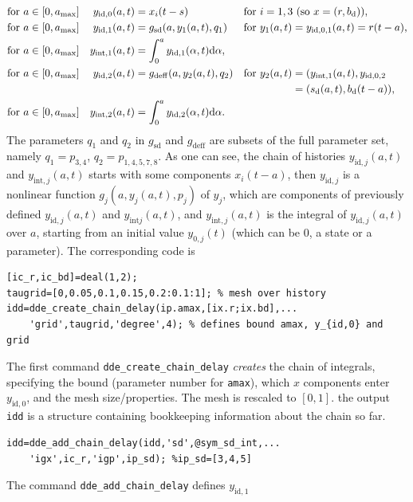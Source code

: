 \documentclass[10pt]{scrartcl}
\renewcommand{\d}{\mathrm{d}}
\newcommand{\blist}[1]{\mbox{\lstinline!#1!}}
\begin{document}
\begin{align*}
  \mbox{for\ }a\in[0,a_{\max}]&&y_{\mathrm{id},0}(a,t)&=x_i(t-s)&&\mbox{for $i=1,3$ (so $x=(r,b_\mathrm{d})$),}\\
  \mbox{for\ }a\in[0,a_{\max}]&&  y_{\mathrm{id},1}(a,t)&=g_\mathrm{sd}(a,y_1(a,t),q_1)&&\mbox{for $y_1(a,t)=y_{\mathrm{id},0,1}(a,t)=r(t-a)$,}\\
  \mbox{for\ }a\in[0,a_{\max}]&&  y_{\mathrm{int},1}(a,t)&=\int_0^a y_{\mathrm{id},1}(\alpha,t)\d \alpha,\\
  \mbox{for\ }a\in[0,a_{\max}]&&  y_{\mathrm{id},2}(a,t)&=g_\mathrm{deff}(a,y_2(a,t),q_2)&&\mbox{for $y_2(a,t)=(y_{\mathrm{int},1}(a,t),y_{\mathrm{id,0,2}}$}\\
  &&&&&\mbox{\phantom{for\ }$\phantom{y_2(t,a)}=(s_\mathrm{d}(a,t),b_\mathrm{d}(t-a))$,}\\
  \mbox{for\ }a\in[0,a_{\max}]&&  y_{\mathrm{int},2}(a,t)&=\int_0^a y_{\mathrm{id},2}(\alpha,t)\d \alpha.  
\end{align*}
The parameters $q_1$ and $q_2$ in $g_\mathrm{sd}$ and
$g_\mathrm{deff}$ are subsets of the full parameter set, namely
$q_1=p_{3,4}$, $q_2=p_{1,4,5,7,8}$.  As one can see, the chain of
histories $y_{\mathrm{id},j}(a,t)$ and $y_{\mathrm{int},j}(a,t)$
starts with some components $x_i(t-a)$, then $y_{\mathrm{id},j}$ is a
nonlinear function $g_j(a, y_j(a,t),p_j)$ of $y_j$, which are
components of previously defined $y_{\mathrm{id},j}(a,t)$ and
$y_{\mathrm{int}j}(a,t)$, and $y_{\mathrm{int},j}(a,t)$ is the
integral of $y_{\mathrm{id},j}(a,t)$ over $a$, starting from an
initial value $y_{0,j}(t)$ (which can be $0$, a state or a
parameter). The corresponding code is
\begin{lstlisting}
[ic_r,ic_bd]=deal(1,2);
taugrid=[0,0.05,0.1,0.15,0.2:0.1:1]; % mesh over history
idd=dde_create_chain_delay(ip.amax,[ix.r;ix.bd],...
    'grid',taugrid,'degree',4); % defines bound amax, y_{id,0} and grid
\end{lstlisting}
The first command \blist{dde_create_chain_delay} \emph{creates} the
chain of integrals, specifying the bound (parameter number for
\blist{amax}), which $x$ components enter $y_{\mathrm{id},0}$, and the
mesh size/properties. The mesh is rescaled to $[0,1]$. the output
\blist{idd} is a structure containing bookkeeping information about
the chain so far.
\begin{lstlisting}
idd=dde_add_chain_delay(idd,'sd',@sym_sd_int,...
    'igx',ic_r,'igp',ip_sd); %ip_sd=[3,4,5]  
\end{lstlisting}
The command \blist{dde_add_chain_delay} defines $y_{\mathrm{id},1}$
\end{document}
